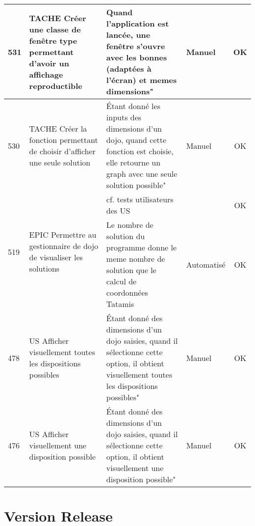 \begin{adjustwidth}{-1.5cm}{0cm}
{\begin{tabular}{|m{0.6cm}|m{5.5cm}|m{8cm}|m{2cm}|c|}
            531                      & TACHE Créer une classe de fenêtre type permettant d'avoir un affichage reproductible            & Quand l'application est lancée, une fenêtre s'ouvre avec les bonnes (adaptées à l'écran) et memes dimensions"                                                    & Manuel          & OK       \\ \hline
            530                      & TACHE Créer la fonction permettant de choisir d'afficher une seule solution                     & Étant donné les inputs des dimensions d'un dojo, quand cette fonction est choisie, elle retourne un graph avec une seule solution possible"                      & Manuel          & OK       \\ \hline
            \multirow{2}{0.6cm}{519} & \multirow{2}{5.5cm}{EPIC Permettre au gestionnaire de dojo de visualiser les solutions}         & cf. tests utilisateurs des US                                                                                                                                    &                 & OK       \\ \cline{3-5}
                                     &                                                                                                 & Le nombre de solution du programme donne le meme nombre de solution que le calcul de coordonnées Tatamis                                                         & Automatisé      & OK       \\ \hline
            478                      & US Afficher visuellement toutes les dispositions possibles                                      & Étant donné des dimensions d'un dojo saisies, quand il sélectionne cette option, il obtient visuellement toutes les dispositions possibles"                      & Manuel          & OK       \\ \hline
            476                      & US Afficher visuellement une disposition possible                                               & Étant donné des dimensions d'un dojo saisies, quand il sélectionne cette option, il obtient visuellement une disposition possible"                               & Manuel          & OK       \\ \hline
        \end{tabular}}
\end{adjustwidth}



\section{Version Release}